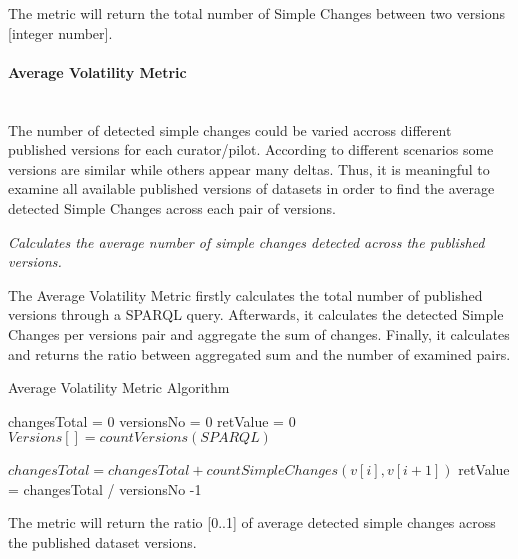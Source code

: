 The metric will return the total number of Simple Changes between two versions [integer number].



\paragraph{Average Volatility Metric} ~\\ %
The number of detected simple changes could be varied accross different published versions for each curator/pilot. According to different scenarios some versions are similar while others appear many deltas. Thus, it is meaningful to examine all available published versions of datasets in order to find the average detected Simple Changes across each pair of versions. 

\begin{mdframed}[style=metricdefinition]
\emph{Calculates the average number of simple changes detected across the published versions.}
\end{mdframed}

The Average Volatility Metric firstly calculates the total number of published versions through a SPARQL query. Afterwards, it calculates the detected Simple Changes per versions pair and aggregate the sum of changes. Finally, it calculates and returns the ratio between aggregated sum and the number of examined pairs.


\begin{algorithm}
\caption{Average Volatility Metric Algorithm}
\begin{algorithmic}[1]

\State changesTotal = 0
\State versionsNo = 0
\State retValue = 0
\EndProcedure
{}
\State $ Versions [] = countVersions (SPARQL)$

\State $changesTotal = changesTotal + countSimpleChanges(v[i],v[i+1])$
\EndFor
\EndProcedure
\State retValue = changesTotal / versionsNo -1
\State {}
\end{algorithmic}
\end{algorithm}

The metric will return the ratio [0..1] of average detected simple changes across the published dataset versions. 



